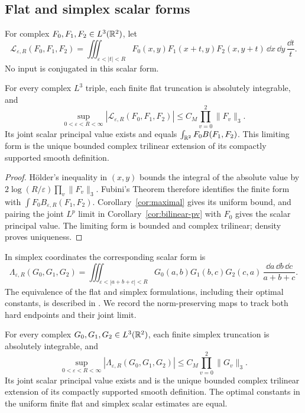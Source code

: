 \subsection{Flat and simplex scalar forms}

For complex $F_0,F_1,F_2\in L^3(\mathbb R^2)$, let
\[
 \mathcal L_{\varepsilon,R}(F_0,F_1,F_2)
 =\iiint_{\varepsilon<|t|<R}
 F_0(x,y)F_1(x+t,y)F_2(x,y+t)
 \,\dd x\,\dd y\,\frac{\dd t}{t}.
\]
No input is conjugated in this scalar form.

\begin{corollary}\label{cor:scalar-pv}
For every complex $L^3$ triple, each finite flat truncation is absolutely
integrable, and
\[
 \sup_{0<\varepsilon<R<\infty}
 |\mathcal L_{\varepsilon,R}(F_0,F_1,F_2)|
 \le C_M\prod_{v=0}^2\|F_v\|_3.
\]
Its joint scalar principal value exists and equals
$\int_{\mathbb R^2}F_0 B(F_1,F_2)$. This limiting form is the unique bounded
complex trilinear extension of its compactly supported smooth definition.
\end{corollary}

\begin{proof}
H\"older's inequality in $(x,y)$ bounds the integral of the absolute
value by $2\log(R/\varepsilon)\prod_v\|F_v\|_3$. Fubini's Theorem
therefore identifies the finite form with
$\int F_0 B_{\varepsilon,R}(F_1,F_2)$.
Corollary~\ref{cor:maximal} gives its uniform bound, and pairing the
joint $L^p$ limit in Corollary~\ref{cor:bilinear-pv} with $F_0$ gives
the scalar principal value. The limiting form is bounded and complex
trilinear; density proves uniqueness.
\end{proof}

In simplex coordinates the corresponding scalar form is
\[
 \Lambda_{\varepsilon,R}(G_0,G_1,G_2)
 =\iiint_{\varepsilon<|a+b+c|<R}
 G_0(a,b)G_1(b,c)G_2(c,a)
 \,\frac{\dd a\,\dd b\,\dd c}{a+b+c}.
\]
The equivalence of the flat and simplex formulations, including their
optimal constants, is described in
\cite[Appendix~B.1]{KovacThieleZorinKranich2015}. We record the
norm-preserving maps to track both hard endpoints and their joint limit.

\begin{proposition}\label{prop:flat-equivalence}
For every complex $G_0,G_1,G_2\in L^3(\mathbb R^2)$, each finite simplex
truncation is absolutely integrable, and
\[
 \sup_{0<\varepsilon<R<\infty}
 |\Lambda_{\varepsilon,R}(G_0,G_1,G_2)|
 \le C_M\prod_{v=0}^2\|G_v\|_3.
\]
Its joint scalar principal value exists and is the unique bounded
complex trilinear extension of its compactly supported smooth
definition. The optimal constants in the uniform finite flat and
simplex scalar estimates are equal.
\end{proposition}

